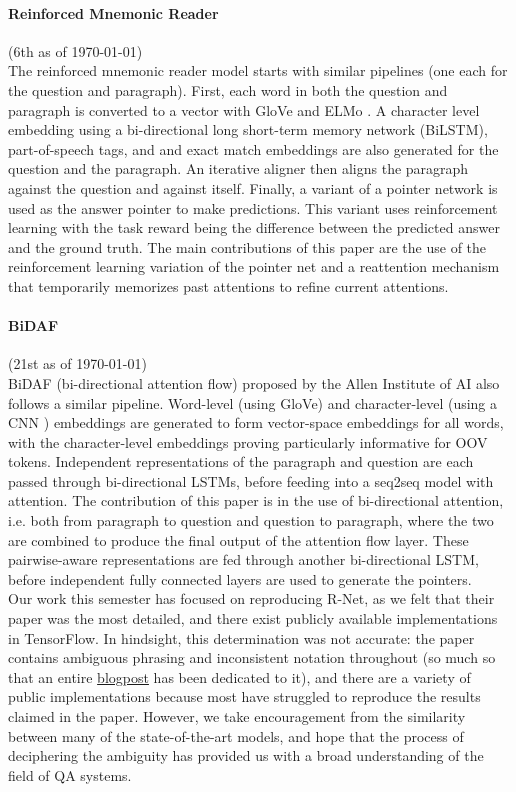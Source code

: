 \documentclass{article}
\begin{document}
\paragraph{Reinforced Mnemonic Reader} (6th as of \today) \\
The reinforced mnemonic reader model \cite{Mnemonic} starts with similar pipelines (one each for the question and paragraph). First, each word in both the question and paragraph is converted to a vector with GloVe and ELMo \cite{ELMo}. A character level embedding using a bi-directional long short-term memory network (BiLSTM), part-of-speech tags, and and exact match embeddings are also generated for the question and the paragraph. An iterative aligner then aligns the paragraph against the question and against itself. Finally, a variant of a pointer network is used as the answer pointer to make predictions. This variant uses reinforcement learning with the task reward being the difference between the predicted answer and the ground truth. The main contributions of this paper are the use of the reinforcement learning variation of the pointer net and a reattention mechanism that temporarily memorizes past attentions to refine current attentions.

\paragraph{BiDAF} (21st as of \today) \\
BiDAF (bi-directional attention flow) \cite{BiDAF} proposed by the Allen Institute of AI also follows a similar pipeline. Word-level (using GloVe) and character-level (using a CNN \cite{Kim}) embeddings are generated to form vector-space embeddings for all words, with the character-level embeddings proving particularly informative for OOV tokens. Independent representations of the paragraph and question are each passed through bi-directional LSTMs, before feeding into a seq2seq model with attention. The contribution of this paper is in the use of bi-directional attention, i.e. both from paragraph to question and question to paragraph, where the two are combined to produce the final output of the attention flow layer. These pairwise-aware representations are fed through another bi-directional LSTM, before independent fully connected layers are used to generate the pointers. \\ 

Our work this semester has focused on reproducing R-Net, as we felt that their paper was the most detailed, and there exist publicly available implementations in TensorFlow. In hindsight, this determination was not accurate: the paper contains ambiguous phrasing and inconsistent notation throughout (so much so that an entire \href{https://yerevann.github.io/2017/08/25/challenges-of-reproducing-r-net-neural-network-using-keras/}{blogpost} has been dedicated to it), and there are a variety of public implementations because most have struggled to reproduce the results claimed in the paper. However, we take encouragement from the similarity between many of the state-of-the-art models, and hope that the process of deciphering the ambiguity has provided us with a broad understanding of the field of QA systems.
\end{document}
